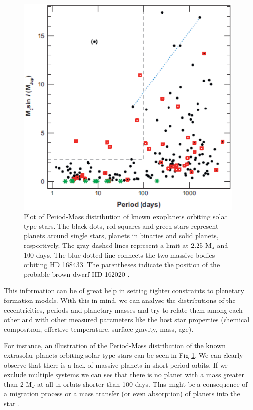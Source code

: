 \documentclass[dvips,12pt,a4paper]{report}
\begin{document}
\begin{figure}[h]
\centering
\includegraphics[height=9 cm]{pics/massplanet2}
\caption[Period Mass distributions of known extrasolar planets ]{Plot of Period-Mass distribution of known exoplanets orbiting solar type stars. The black dots, red squares and green stars represent planets around single stars, planets in binaries and solid planets, respectively. The gray dashed lines represent a limit at 2.25 M$_{J}$ and 100 days. The blue dotted line connects the two massive bodies orbiting HD 168433. The parentheses indicate the position of the probable brown dwarf HD 162020 \citep{Udry-2007}. }
\label{planetmass}
\end{figure}

This information can be of great help in setting tighter constraints to planetary formation models. With this in mind, we can analyse the distributions of the eccentricities, periods and planetary masses and try to relate them among each other and with other measured parameters like the host star properties (chemical composition, effective temperature, surface gravity, mass, age). 

For instance, an illustration of the Period-Mass distribution of the known extrasolar planets orbiting solar type stars can be seen in Fig \ref{planetmass}. We can clearly observe that there is a lack of massive planets in short period orbits. If we exclude multiple systems we can see that there is no planet with a mass greater than 2 M$_{J}$ at all in orbits shorter than 100 days. This might be a consequence of a migration process or a mass transfer (or even absorption) of planets into the star \citep[e.g.][]{Trilling-1998}. %
 
\end{document}
